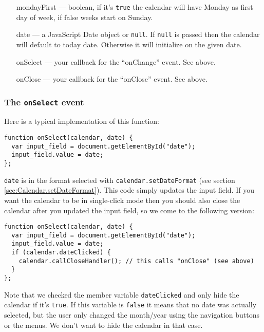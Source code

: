 \documentclass[a4paper,10pt]{article}
\begin{document}
\begin{itemize}

\item [mondayFirst] --- boolean, if it's \texttt{true} the calendar will have
Monday as first day of week, if false weeks start on Sunday.

\item [date] --- a JavaScript Date object or \texttt{null}.  If \texttt{null}
is passed then the calendar will default to today date.  Otherwise it will
initialize on the given date.

\item [onSelect] --- your callback for the ``onChange'' event.  See above.

\item [onClose] --- your callback for the ``onClose'' event.  See above.

\end{itemize}

\subsubsection*{The \texttt{onSelect} event}\label{sec:Calendar.onSelect}

Here is a typical implementation of this function:

\begin{verbatim}
function onSelect(calendar, date) {
  var input_field = document.getElementById("date");
  input_field.value = date;
};
\end{verbatim}

\noindent \texttt{date} is in the format selected with \texttt{calendar.setDateFormat}
(see section \ref{sec:Calendar.setDateFormat}).  This code simply updates the
input field.  If you want the calendar to be in single-click mode then you
should also close the calendar after you updated the input field, so we come to
the following version:

\begin{verbatim}
function onSelect(calendar, date) {
  var input_field = document.getElementById("date");
  input_field.value = date;
  if (calendar.dateClicked) {
    calendar.callCloseHandler(); // this calls "onClose" (see above)
  }
};
\end{verbatim}

\noindent Note that we checked the member variable \texttt{dateClicked} and
only hide the calendar if it's \texttt{true}.  If this variable is \texttt{false} it
means that no date was actually selected, but the user only changed the
month/year using the navigation buttons or the menus.  We don't want to hide
the calendar in that case.
\end{document}
